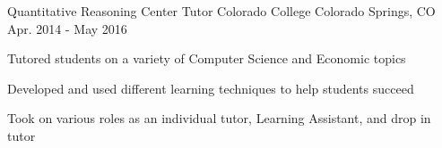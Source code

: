 \begin{cventries}


\vspace{-1.25em}
\cventry
{Quantitative Reasoning Center Tutor} %
{Colorado College} %
{Colorado Springs, CO} %
{Apr. 2014 - May 2016} %
{ %
\begin{cvitems}
\item{Tutored students on a variety of Computer Science and Economic topics}
\item{Developed and used different learning techniques to help students succeed}
\item{Took on various roles as an individual tutor, Learning Assistant, and drop in tutor}
\end{cvitems}
}



\end{cventries}
